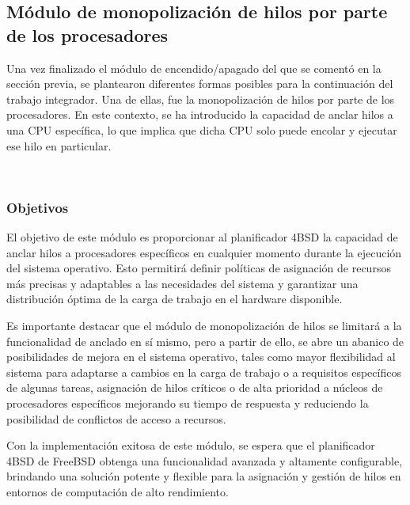 \subsection{Módulo de monopolización de hilos por parte de los procesadores}


Una vez finalizado el módulo de encendido/apagado del que se comentó en la sección previa, se plantearon diferentes formas posibles para la continuación del trabajo integrador. Una de ellas, fue la monopolización de hilos por parte de los procesadores. En este contexto, se ha introducido la capacidad de anclar hilos a una CPU específica, lo que implica que dicha CPU solo puede encolar y ejecutar ese hilo en particular.

\

\subsubsection{Objetivos}

El objetivo de este módulo es proporcionar al planificador 4BSD la capacidad de anclar hilos a procesadores específicos en cualquier momento durante la ejecución del sistema operativo. Esto permitirá definir políticas de asignación de recursos más precisas y adaptables a las necesidades del sistema y garantizar una distribución óptima de la carga de trabajo en el hardware disponible.\par

Es importante destacar que el módulo de monopolización de hilos se limitará a la funcionalidad de anclado en sí mismo, pero a partir de ello, se abre un abanico de posibilidades de mejora en el sistema operativo, tales como mayor flexibilidad al sistema para adaptarse a cambios en la carga de trabajo o a requisitos específicos de algunas tareas, asignación de hilos críticos o de alta prioridad a núcleos de procesadores específicos mejorando su tiempo de respuesta y reduciendo la posibilidad de conflictos de acceso a recursos.\par

Con la implementación exitosa de este módulo, se espera que el planificador 4BSD de FreeBSD obtenga una funcionalidad avanzada y altamente configurable, brindando una solución potente y flexible para la asignación y gestión de hilos en entornos de computación de alto rendimiento.\par

